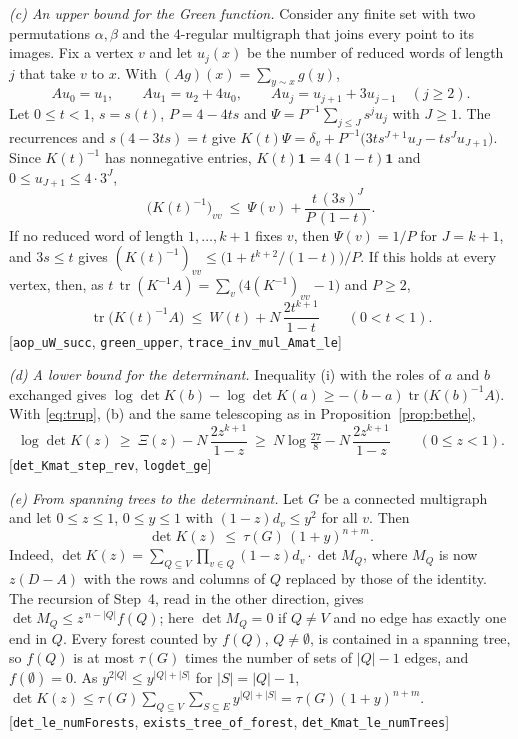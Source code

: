 \documentclass[11pt]{amsart}
\theoremstyle{plain}
\theoremstyle{remark}
\newcommand{\code}[1]{\texttt{#1}}
\DeclareMathOperator{\tr}{tr}
\begin{document}
\smallskip\noindent\emph{(c) An upper bound for the Green function.} Consider any finite set with two
permutations $\alpha,\beta$ and the $4$-regular multigraph that joins every point to its images. Fix a vertex $v$
and let $u_j(x)$ be the number of reduced words of length $j$ that take $v$ to $x$. With
$(Ag)(x)=\sum_{y\sim x}g(y)$,
\[
  Au_0=u_1,\qquad Au_1=u_2+4u_0,\qquad Au_j=u_{j+1}+3u_{j-1}\quad(j\ge2).
\]
Let $0\le t<1$, $s=s(t)$, $P=4-4ts$ and $\Psi=P^{-1}\sum_{j\le J}s^ju_j$ with $J\ge1$. The recurrences and
$s(4-3ts)=t$ give $K(t)\Psi=\delta_v+P^{-1}\bigl(3ts^{J+1}u_J-ts^{J}u_{J+1}\bigr)$. Since $K(t)^{-1}$ has
nonnegative entries, $K(t)\mathbf{1}=4(1-t)\mathbf{1}$ and $0\le u_{J+1}\le4\cdot3^{J}$,
\[
  \bigl(K(t)^{-1}\bigr)_{vv}\ \le\ \Psi(v)+\frac{t\,(3s)^J}{P\,(1-t)}.
\]
If no reduced word of length $1,\dots,k+1$ fixes $v$, then $\Psi(v)=1/P$ for $J=k+1$, and $3s\le t$ gives
$(K(t)^{-1})_{vv}\le\bigl(1+t^{k+2}/(1-t)\bigr)/P$. If this holds at every vertex, then, as
$t\,\tr(K^{-1}A)=\sum_v\bigl(4(K^{-1})_{vv}-1\bigr)$ and $P\ge2$,
\begin{equation}\label{eq:trup}
  \tr\bigl(K(t)^{-1}A\bigr)\ \le\ W(t)+N\,\frac{2t^{k+1}}{1-t}\qquad(0<t<1).
\end{equation}
[\code{aop\_uW\_succ}, \code{green\_upper}, \code{trace\_inv\_mul\_Amat\_le}]

\smallskip\noindent\emph{(d) A lower bound for the determinant.} Inequality (i) with the roles of $a$ and $b$
exchanged gives $\log\det K(b)-\log\det K(a)\ge-(b-a)\tr\bigl(K(b)^{-1}A\bigr)$. With \eqref{eq:trup}, (b) and
the same telescoping as in Proposition~\ref{prop:bethe},
\[
  \log\det K(z)\ \ge\ \Xi(z)-N\,\frac{2z^{k+1}}{1-z}\ \ge\ N\log\tfrac{27}{8}-N\,\frac{2z^{k+1}}{1-z}\qquad(0\le z<1).
\]
[\code{det\_Kmat\_step\_rev}, \code{logdet\_ge}]

\smallskip\noindent\emph{(e) From spanning trees to the determinant.} Let $G$ be a connected multigraph and let
$0\le z\le1$, $0\le y\le1$ with $(1-z)d_v\le y^2$ for all $v$. Then
\begin{equation}\label{eq:detup}
  \det K(z)\ \le\ \tau(G)\,(1+y)^{n+m}.
\end{equation}
Indeed, $\det K(z)=\sum_{Q\subseteq V}\prod_{v\in Q}(1-z)d_v\cdot\det M_Q$, where $M_Q$ is now $z(D-A)$ with the rows
and columns of $Q$ replaced by those of the identity. The recursion of Step~4, read in the other direction,
gives $\det M_Q\le z^{\,n-|Q|}f(Q)$; here $\det M_Q=0$ if $Q\ne V$ and no edge has exactly one end in $Q$. Every
forest counted by $f(Q)$, $Q\ne\emptyset$, is contained in a spanning tree, so $f(Q)$ is at most $\tau(G)$ times
the number of sets of $|Q|-1$ edges, and $f(\emptyset)=0$. As $y^{2|Q|}\le y^{|Q|+|S|}$ for $|S|=|Q|-1$,
$\det K(z)\le\tau(G)\sum_{Q\subseteq V}\sum_{S\subseteq E}y^{|Q|+|S|}=\tau(G)(1+y)^{n+m}$.
[\code{det\_le\_numForests}, \code{exists\_tree\_of\_forest}, \code{det\_Kmat\_le\_numTrees}]
\end{document}
